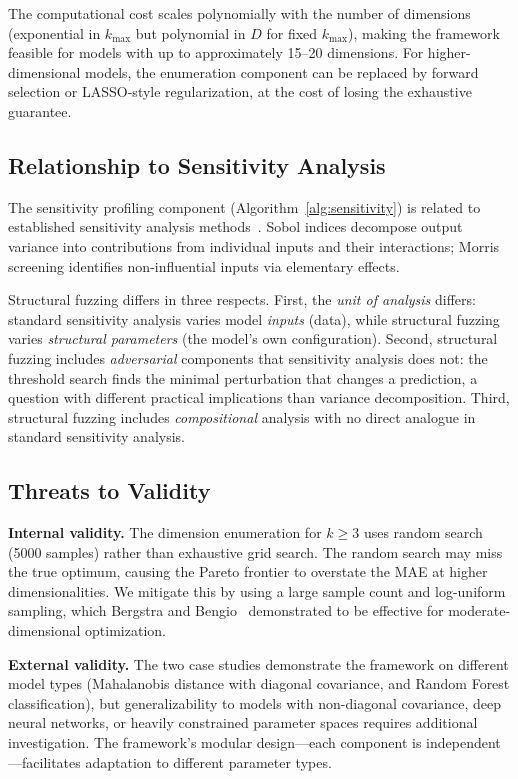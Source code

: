\documentclass[manuscript,review,anonymous]{acmart}
\begin{document}
The computational cost scales polynomially with the number of dimensions (exponential in $k_{\max}$ but polynomial in $D$ for fixed $k_{\max}$), making the framework feasible for models with up to approximately 15--20 dimensions.
For higher-dimensional models, the enumeration component can be replaced by forward selection or LASSO-style regularization, at the cost of losing the exhaustive guarantee.

\subsection{Relationship to Sensitivity Analysis}

The sensitivity profiling component (Algorithm~\ref{alg:sensitivity}) is related to established sensitivity analysis methods~\cite{saltelli2008}.
Sobol indices decompose output variance into contributions from individual inputs and their interactions; Morris screening identifies non-influential inputs via elementary effects.

Structural fuzzing differs in three respects.
First, the \emph{unit of analysis} differs: standard sensitivity analysis varies model \emph{inputs} (data), while structural fuzzing varies \emph{structural parameters} (the model's own configuration).
Second, structural fuzzing includes \emph{adversarial} components that sensitivity analysis does not: the threshold search finds the minimal perturbation that changes a prediction, a question with different practical implications than variance decomposition.
Third, structural fuzzing includes \emph{compositional} analysis with no direct analogue in standard sensitivity analysis.

\subsection{Threats to Validity}

\textbf{Internal validity.}
The dimension enumeration for $k \geq 3$ uses random search (5000 samples) rather than exhaustive grid search.
The random search may miss the true optimum, causing the Pareto frontier to overstate the MAE at higher dimensionalities.
We mitigate this by using a large sample count and log-uniform sampling, which Bergstra and Bengio~\cite{bergstra2012} demonstrated to be effective for moderate-dimensional optimization.

\textbf{External validity.}
The two case studies demonstrate the framework on different model types (Mahalanobis distance with diagonal covariance, and Random Forest classification), but generalizability to models with non-diagonal covariance, deep neural networks, or heavily constrained parameter spaces requires additional investigation.
The framework's modular design---each component is independent---facilitates adaptation to different parameter types.
\end{document}
